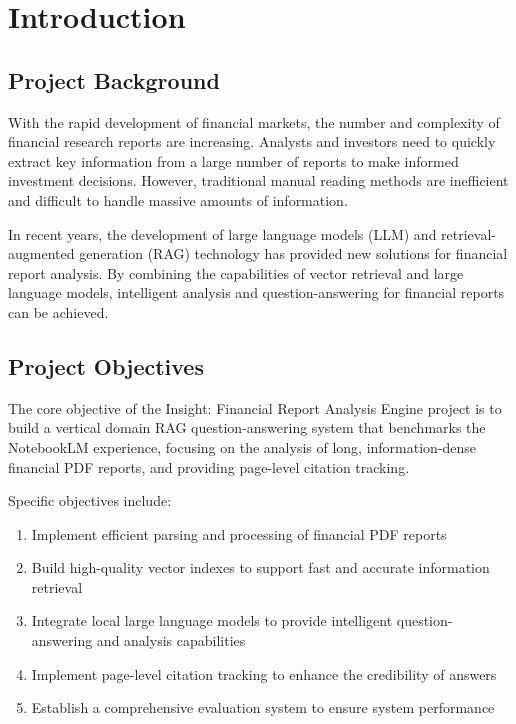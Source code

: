 \section{Introduction}

\subsection{Project Background}

With the rapid development of financial markets, the number and complexity of
financial research reports are increasing. Analysts and investors need to
quickly extract key information from a large number of reports to make informed
investment decisions. However, traditional manual reading methods are
inefficient and difficult to handle massive amounts of information.

In recent years, the development of large language models (LLM) and
retrieval-augmented generation (RAG) technology has provided new solutions for
financial report analysis. By combining the capabilities of vector retrieval
and large language models, intelligent analysis and question-answering for
financial reports can be achieved.

\subsection{Project Objectives}

The core objective of the Insight: Financial Report Analysis Engine project is
to build a vertical domain RAG question-answering system that benchmarks the
NotebookLM experience, focusing on the analysis of long, information-dense
financial PDF reports, and providing page-level citation tracking.

Specific objectives include:

\begin{enumerate}
    \item Implement efficient parsing and processing of financial PDF reports
    \item Build high-quality vector indexes to support fast and accurate information
          retrieval
    \item Integrate local large language models to provide intelligent question-answering
          and analysis capabilities
    \item Implement page-level citation tracking to enhance the credibility of answers
    \item Establish a comprehensive evaluation system to ensure system performance
\end{enumerate}

